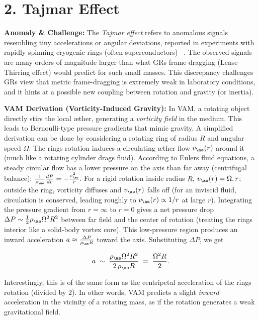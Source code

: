 \documentclass[a4paper, aps,preprint,superscriptaddress, 12pt]{revtex4}
\begin{document}
\section*{2. Tajmar Effect}

\textbf{Anomaly \& Challenge: } The \textit{Tajmar effect} refers to anomalous signals resembling tiny accelerations or angular deviations, reported in experiments with rapidly spinning cryogenic rings (often superconductors)~\cite{Iskandarani2025b} . The observed signals are many orders of magnitude larger than what GR\rqs s frame-dragging (Lense–Thirring effect) would predict for such small masses. This discrepancy challenges GR\rqs s view that metric frame-dragging is extremely weak in laboratory conditions, and it hints at a possible new coupling between rotation and gravity (or inertia).


\textbf{VAM Derivation (Vorticity-Induced Gravity):} In VAM, a rotating object directly stirs the local æther, generating a \textit{vorticity field} in the medium. This leads to Bernoulli-type pressure gradients that mimic gravity. A simplified derivation can be done by considering a rotating ring of radius $R$ and angular speed $\Omega$. The ring\rqs s rotation induces a circulating æther flow $v_{\ae}(r)$ around it (much like a rotating cylinder drags fluid). According to Euler\rqs s fluid equations, a steady circular flow has a lower pressure on the axis than far away (centrifugal balance): $\frac{1}{\rho_{\ae}}\frac{dP}{dr} = -\frac{v_{\ae}^2}{r}$. For a rigid rotation inside radius $R$, $v_{\ae}(r)=\Omega,r$; outside the ring, vorticity diffuses and $v_{\ae}(r)$ falls off (for an inviscid fluid, circulation is conserved, leading roughly to $v_{\ae}(r)\propto 1/r$ at large $r$). Integrating the pressure gradient from $r=\infty$ to $r=0$ gives a net pressure drop $\Delta P \sim \frac{1}{2}\rho_{\ae}\Omega^2 R^2$ between far field and the center of rotation (treating the ring\rqs s interior like a solid-body vortex core). This low-pressure region produces an inward acceleration $a \approx \frac{\Delta P}{\rho_{\ae}R}$ toward the axis. Substituting $\Delta P$, we get

\begin{equation}
    a \;\sim\; \frac{\rho_{\ae}\Omega^2 R^2}{2\,\rho_{\ae}R} \;=\; \frac{\Omega^2 R}{2}.
\end{equation}

Interestingly, this is of the same form as the centripetal acceleration of the ring\rqs s rotation (divided by 2). In other words, VAM predicts a slight \textit{inward} acceleration in the vicinity of a rotating mass, as if the rotation generates a weak gravitational field.
\end{document}
